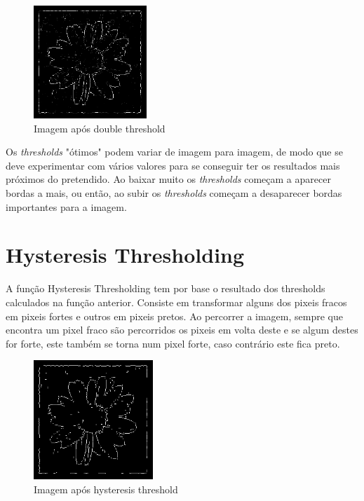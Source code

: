 \documentclass[a4paper]{report}
\begin{document}
\begin{figure}[H]
    \centering
        \includegraphics[width=0.38\textwidth]{images/Canny/flowerDoubleThreshold.png}
        \caption{Imagem após double threshold}
\end{figure}

Os \textit{thresholds} "ótimos" podem variar de imagem para imagem, de modo que se deve
experimentar com vários valores para se conseguir ter os resultados mais próximos do pretendido. Ao baixar muito os \textit{thresholds} começam a aparecer bordas a mais, ou então, ao subir os \textit{thresholds} começam a desaparecer bordas importantes para a imagem.


\section{Hysteresis Thresholding}
A função Hysteresis Thresholding tem por base o resultado dos thresholds calculados na função anterior. Consiste em transformar alguns dos pixeis fracos em pixeis fortes e outros em pixeis pretos. Ao percorrer a imagem, sempre que encontra um pixel fraco são percorridos os pixeis em volta deste e se algum destes for forte, este também se torna num pixel forte, caso contrário este fica preto.



\begin{figure}[H]
    \centering
        \includegraphics[width=0.4\textwidth]{images/Canny/flowerHysteresis.png}
        \caption{Imagem após hysteresis threshold}
\end{figure}
\end{document}
